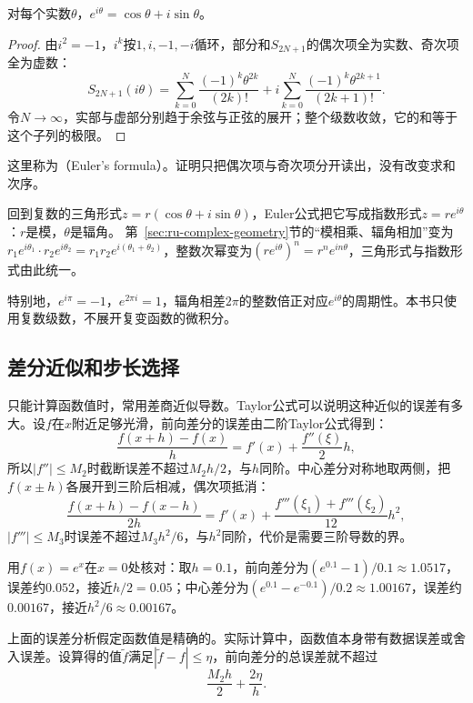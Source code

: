 \begin{theorem}[Euler公式]
\label{thm:ru-euler-formula}
对每个实数$\theta$，$e^{i\theta}=\cos\theta+i\sin\theta$。
\end{theorem}
\begin{proof}
由$i^2=-1$，$i^k$按$1,i,-1,-i$循环，部分和$S_{2N+1}$的偶次项全为实数、奇次项全为虚数：
\[
 S_{2N+1}(i\theta)=\sum_{k=0}^N\frac{(-1)^k\theta^{2k}}{(2k)!}+i\sum_{k=0}^N\frac{(-1)^k\theta^{2k+1}}{(2k+1)!}.
\]
令$N\to\infty$，实部与虚部分别趋于余弦与正弦的展开；整个级数收敛，它的和等于这个子列的极限。
\end{proof}
这里称为（Euler's formula）。证明只把偶次项与奇次项分开读出，没有改变求和次序。

回到复数的三角形式$z=r(\cos\theta+i\sin\theta)$，Euler公式把它写成指数形式$z=re^{i\theta}$：$r$是模，$\theta$是辐角。
第~\ref{sec:ru-complex-geometry}节的“模相乘、辐角相加”变为$r_1e^{i\theta_1}\cdot r_2e^{i\theta_2}=r_1r_2e^{i(\theta_1+\theta_2)}$，整数次幂变为$(re^{i\theta})^n=r^ne^{in\theta}$，三角形式与指数形式由此统一。

特别地，$e^{i\pi}=-1$，$e^{2\pi i}=1$，辐角相差$2\pi$的整数倍正对应$e^{i\theta}$的周期性。本书只使用复数级数，不展开复变函数的微积分。

\subsection{差分近似和步长选择}
\label{sec:ru-finite-differences}

只能计算函数值时，常用差商近似导数。Taylor公式可以说明这种近似的误差有多大。设$f$在$x$附近足够光滑，前向差分的误差由二阶Taylor公式得到：
\[
 \frac{f(x+h)-f(x)}h=f'(x)+\frac{f''(\xi)}2h,
\]
所以$|f''|\leq M_2$时截断误差不超过$M_2h/2$，与$h$同阶。中心差分对称地取两侧，把$f(x\pm h)$各展开到三阶后相减，偶次项抵消：
\[
 \frac{f(x+h)-f(x-h)}{2h}=f'(x)+\frac{f'''(\xi_1)+f'''(\xi_2)}{12}h^2,
\]
$|f'''|\leq M_3$时误差不超过$M_3h^2/6$，与$h^2$同阶，代价是需要三阶导数的界。
\begin{example}[指数函数的差分误差]
\label{ex:ru-exp-finite-difference}
用$f(x)=e^x$在$x=0$处核对：取$h=0.1$，前向差分为$(e^{0.1}-1)/0.1\approx1.0517$，误差约$0.052$，接近$h/2=0.05$；中心差分为$(e^{0.1}-e^{-0.1})/0.2\approx1.00167$，误差约$0.00167$，接近$h^2/6\approx0.00167$。
\end{example}

上面的误差分析假定函数值是精确的。实际计算中，函数值本身带有数据误差或舍入误差。设算得的值$\tilde f$满足$|\tilde f-f|\leq\eta$，前向差分的总误差就不超过
\[
 \frac{M_2h}2+\frac{2\eta}h.
\]

